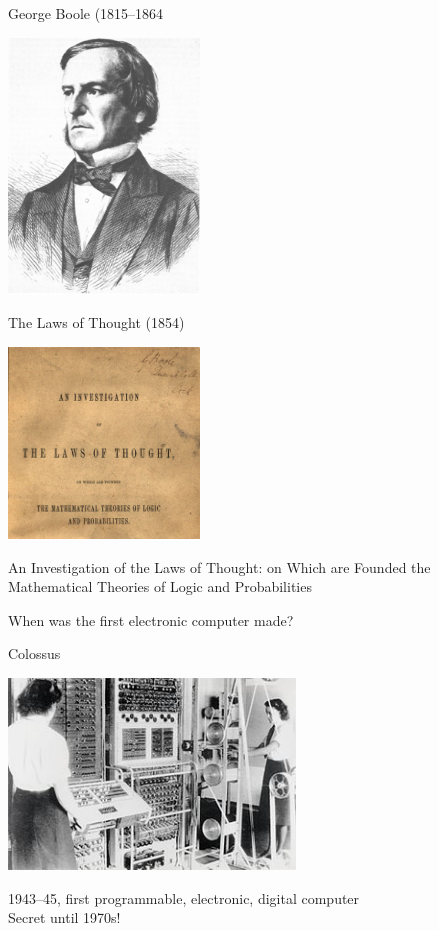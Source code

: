 \documentclass[xcolor={usenames,dvipsnames,svgnames,table},12pt]{beamer}
\begin{document}
\begin{frame}{George Boole (1815--1864}
  \begin{center}
    \includegraphics[width=2in]{Portrait_of_George_Boole}
  \end{center}
\end{frame}

\begin{frame}{The Laws of Thought (1854)}
  \begin{center}
    \includegraphics[width=2in]{lawsofthought}

    An Investigation of the Laws of Thought: on Which are Founded the
    Mathematical Theories of Logic and Probabilities
  \end{center}
\end{frame}

\begin{frame}{}
  \begin{center}
    When was the first electronic computer made?
  \end{center}
\end{frame}

\begin{frame}{Colossus}
  \begin{center}
    \includegraphics[width=3in]{Colossus}

    1943--45, first programmable, electronic, digital computer \\
    Secret until 1970s!
  \end{center}
\end{frame}
\end{document}
